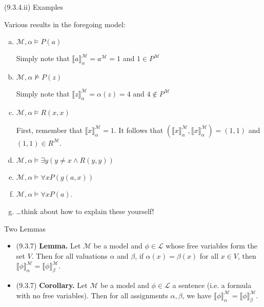 \begin{frame}{(9.3.4.ii) Examples}

	Various results in the foregoing model:
	\begin{enumerate}[(a)]
	\itemsep=10pt
			
		  	\item $\mathcal{M},\alpha\vDash P(a)$

				Simply note that $\llbracket a\rrbracket^\mathcal{M}_\alpha=a^\mathcal{M}=1$ and $1\in P^\mathcal{M}$		
					
				\item $\mathcal{M},\alpha\nvDash P(z)$
				
				Simply note that $\llbracket z\rrbracket^\mathcal{M}_\alpha=\alpha(z)=4$ and $4\notin P^\mathcal{M}$
				
				\item $\mathcal{M},\alpha\vDash R(x,x)$
				
				First,  remember that $\llbracket x\rrbracket^\mathcal{M}_\alpha=1.$ It follows that $(\llbracket x\rrbracket^\mathcal{M}_\alpha,\llbracket x\rrbracket^\mathcal{M}_\alpha)=(1,1)$ and $(1,1)\in R^\mathcal{M}$.
				

        \item $\mathcal{M},\alpha\vDash \exists y (y\neq x\land R(y,y))$
				
				\item $\mathcal{M},\alpha\vDash \forall x P(g(a,x))$
				
				\item $\mathcal{M},\alpha\vDash \forall x P(a)$. 
				
			  \item[] \ldots think about how to explain these yourself!
			
			\end{enumerate}
	\end{frame}
	
\begin{frame}{Two Lemmas}

	\begin{itemize}%
	\itemsep=20pt

		\item (9.3.7) \textbf{Lemma.} Let $\mathcal{M}$ be a model and $\phi\in\mathcal{L}$ whose free variables form the set $V$. Then for all valuations $\alpha$ and $\beta$, if $\alpha(x)=\beta(x)$ for all $x\in V$, then $\llbracket\phi\rrbracket_\alpha^\mathcal{M}=\llbracket\phi\rrbracket_\beta^\mathcal{M}$.
		

\item (9.3.7) \textbf{Corollary.}	Let $\mathcal{M}$ be a model and $\phi\in\mathcal{L}$ a sentence (i.e. a formula with no free variables). Then for all assignments $\alpha,\beta$, we have $\llbracket\phi\rrbracket_\alpha^\mathcal{M}=\llbracket\phi\rrbracket_\beta^\mathcal{M}$.
		
		
\end{itemize}

\end{frame}

